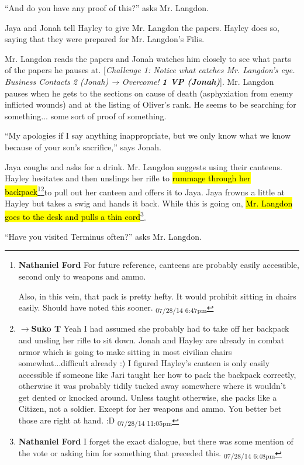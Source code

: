 ``And do you have any proof of this?'' asks Mr. Langdon.

Jaya and Jonah tell Hayley to give Mr. Langdon the papers.  Hayley does so, saying that they were prepared for Mr. Langdon's Filis.

Mr. Langdon reads the papers and Jonah watches him closely to see what parts of the papers he pauses at.  {[}\textit{Challenge 1:  Notice what catches Mr. Langdon's eye. Business Contacts 2 (Jonah) → Overcome! }\textit{\textbf{1 VP (Jonah)}}{]}.  Mr. Langdon pauses when he gets to the sections on cause of death (asphyxiation from enemy inflicted wounds) and at the listing of Oliver's rank.  He seems to be searching for something... some sort of proof of something.

``My apologies if I say anything inappropriate, but we only know what we know because of your son's sacrifice,'' says Jonah.

Jaya coughs and asks for a drink.  Mr. Langdon suggests using their canteens.  Hayley hesitates and then unslings her rifle to \hl{rummage through her backpack}\footnote{\textbf{Nathaniel Ford }For future reference, canteens are probably easily accessible, second only to weapons and ammo.

Also, in this vein, that pack is pretty hefty. It would prohibit sitting in chairs easily. Should have noted this sooner. \textsubscript{07/28/14 6:47pm}}\footnote{$\rightarrow$\textbf{Suko T }Yeah I had assumed she probably had to take off her backpack and unsling her rifle to sit down.  Jonah and Hayley are already in combat armor which is going to make sitting in most civilian chairs somewhat...difficult already :)  I figured Hayley's canteen is only easily accessible if someone like Jari taught her how to pack the backpack correctly, otherwise it was probably tidily tucked away somewhere where it wouldn't get dented or knocked around.  Unless taught otherwise, she packs like a Citizen, not a soldier.  Except for her weapons and ammo.  You better bet those are right at hand. :D \textsubscript{07/28/14 11:05pm}}to pull out her canteen and offers it to Jaya.  Jaya frowns a little at Hayley but takes a swig and hands it back.  While this is going on, \hl{Mr. Langdon goes to the desk and pulls a thin cord}\footnote{\textbf{Nathaniel Ford }I forget the exact dialogue, but there was some mention of the vote or asking him for something that preceded this. \textsubscript{07/28/14 6:48pm}}.

``Have you visited Terminus often?'' asks Mr. Langdon.

